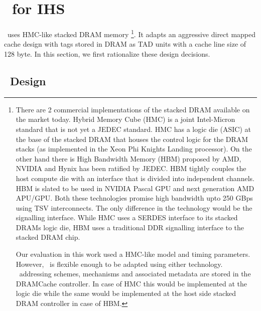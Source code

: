 \section{\cachename\ for IHS} \label{design+mechanism}
\cachename\ uses HMC-like \cite{hmc} stacked DRAM memory
\footnote{
There are 2 commercial implementations of the stacked DRAM available on the market today. 
Hybrid Memory Cube (HMC) is a joint Intel-Micron standard that is not yet a JEDEC standard. 
HMC has a logic die (ASIC) at the base of the stacked DRAM that houses the control logic for the DRAM stacks (as implemented in the Xeon Phi Knights Landing processor\cite{xeonphi}). 
On the other hand there is High Bandwidth Memory (HBM) proposed by AMD, NVIDIA and Hynix has been ratified by JEDEC. 
HBM tightly couples the host compute die with an interface that is divided into independent channels.
HBM is slated to be used in NVIDIA Pascal GPU and next generation AMD APU/GPU.
Both these technologies promise high bandwidth upto 250 GBps using TSV interconnects. The only difference in the technology would be the signalling interface. While HMC uses a SERDES interface to its stacked DRAMs logic die, HBM uses a traditional DDR signalling interface to the stacked DRAM chip.
\par Our evaluation in this work used a HMC-like model and timing parameters. However, \cachename\ is flexible enough to be adapted using either technology. \cachename\ addressing schemes, mechanisms and associated metadata are stored in the DRAMCache controller. In case of HMC this would be implemented at the logic die while the same would be implemented at the host side stacked DRAM controller in case of HBM.
}. It adapts an aggressive direct mapped cache design with tags stored in DRAM as TAD units \cite{alloy} with a cache line size of 128 byte. In this section, we first rationalize these design decisions.

\subsection{\cachename\ Design} \label{design}

